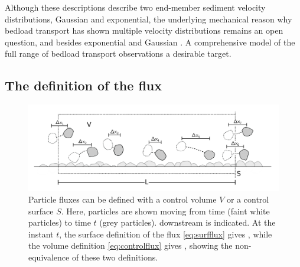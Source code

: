 Although these descriptions describe two end-member sediment velocity distributions, Gaussian and exponential, the underlying mechanical reason why bedload transport has shown multiple velocity distributions remains an open question, and \DIFdelbegin {}\DIFdelend \DIFaddbegin {}\DIFaddend besides exponential and Gaussian \DIFaddbegin {}\DIFaddend \citep[e.g.][]{Houssais2012,Liu2019}.
A comprehensive model of the full range of bedload transport observations \DIFdelbegin {}\DIFdelend \DIFaddbegin {}\DIFaddend a desirable target.

\subsection{The definition of the flux}
\begin{figure}[!htbp]
	\DIFdelbeginFL %
\DIFdelendFL \DIFaddbeginFL \includegraphics[width=\linewidth,keepaspectratio]{./figures/ch1/fluxDefinitions.png}
	\DIFaddendFL \caption{Particle fluxes can be defined with \DIFdelbeginFL {}\DIFdelendFL a control volume $V$ or a control surface $S$. Here, particles are shown moving from time \DIFdelbeginFL {}\DIFdelendFL \DIFaddbeginFL {}\DIFaddendFL (faint white particles) to time $t$ (grey particles). \DIFdelbeginFL {}\DIFdelendFL \DIFaddbeginFL {}\DIFaddendFL downstream \DIFdelbeginFL {}\DIFdelendFL \DIFaddbeginFL {}\DIFaddendFL is indicated. \DIFaddbeginFL {}\DIFaddendFL At the instant $t$, the surface definition of the flux \DIFaddbeginFL {}\DIFaddendFL \ref{eq:surfflux} gives \DIFdelbeginFL {}\DIFdelendFL \DIFaddbeginFL {}\DIFaddendFL , while the volume definition \DIFaddbeginFL {}\DIFaddendFL \ref{eq:controlflux} gives \DIFdelbeginFL {}\DIFdelendFL \DIFaddbeginFL {}\DIFaddendFL ,
	showing the non-equivalence of these two definitions.}
	\label{fig:fluxdefs}
\end{figure}
